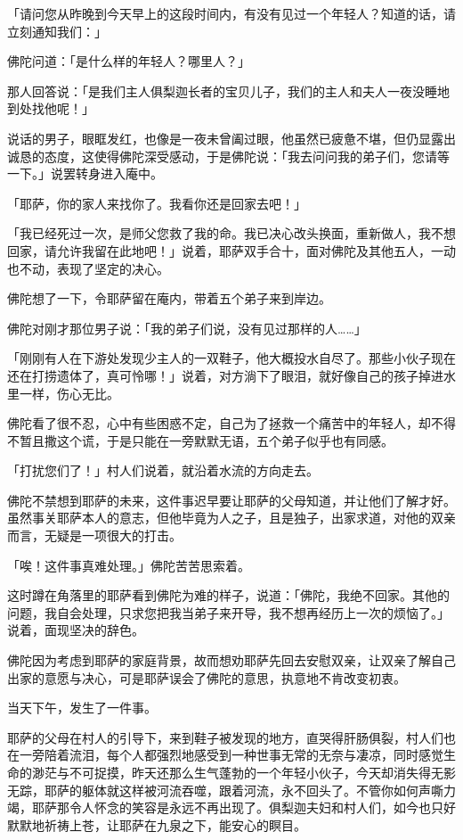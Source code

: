 \documentclass[12pt,twoside,openany]{book}
\begin{document}
「请问您从昨晚到今天早上的这段时间内，有没有见过一个年轻人？知道的话，请立刻通知我们：」

佛陀问道：「是什么样的年轻人？哪里人？」

那人回答说：「是我们主人俱梨迦长者的宝贝儿子，我们的主人和夫人一夜没睡地到处找他呢！」

说话的男子，眼眶发红，也像是一夜未曾阖过眼，他虽然已疲惫不堪，但仍显露出诚恳的态度，这使得佛陀深受感动，于是佛陀说：「我去问问我的弟子们，您请等一下。」说罢转身进入庵中。

「耶萨，你的家人来找你了。我看你还是回家去吧！」

「我已经死过一次，是师父您救了我的命。我已决心改头换面，重新做人，我不想回家，请允许我留在此地吧！」说着，耶萨双手合十，面对佛陀及其他五人，一动也不动，表现了坚定的决心。

佛陀想了一下，令耶萨留在庵内，带着五个弟子来到岸边。

佛陀对刚才那位男子说：「我的弟子们说，没有见过那样的人……」

「刚刚有人在下游处发现少主人的一双鞋子，他大概投水自尽了。那些小伙子现在还在打捞遗体了，真可怜哪！」说着，对方淌下了眼泪，就好像自己的孩子掉进水里一样，伤心无比。

佛陀看了很不忍，心中有些困惑不定，自己为了拯救一个痛苦中的年轻人，却不得不暂且撒这个谎，于是只能在一旁默默无语，五个弟子似乎也有同感。

「打扰您们了！」村人们说着，就沿着水流的方向走去。

佛陀不禁想到耶萨的未来，这件事迟早要让耶萨的父母知道，并让他们了解才好。虽然事关耶萨本人的意志，但他毕竟为人之子，且是独子，出家求道，对他的双亲而言，无疑是一项很大的打击。

「唉！这件事真难处理。」佛陀苦苦思索着。

这时蹲在角落里的耶萨看到佛陀为难的样子，说道：「佛陀，我绝不回家。其他的问题，我自会处理，只求您把我当弟子来开导，我不想再经历上一次的烦恼了。」说着，面现坚决的辞色。

佛陀因为考虑到耶萨的家庭背景，故而想劝耶萨先回去安慰双亲，让双亲了解自己出家的意愿与决心，可是耶萨误会了佛陀的意思，执意地不肯改变初衷。

当天下午，发生了一件事。

耶萨的父母在村人的引导下，来到鞋子被发现的地方，直哭得肝肠俱裂，村人们也在一旁陪着流泪，每个人都强烈地感受到一种世事无常的无奈与凄凉，同时感觉生命的渺茫与不可捉摸，昨天还那么生气蓬勃的一个年轻小伙子，今天却消失得无影无踪，耶萨的躯体就这样被河流吞噬，跟着河流，永不回头了。不管你如何声嘶力竭，耶萨那令人怀念的笑容是永远不再出现了。俱梨迦夫妇和村人们，如今也只好默默地祈祷上苍，让耶萨在九泉之下，能安心的瞑目。
\end{document}
